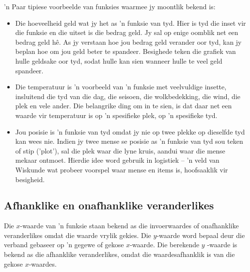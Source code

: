 ’n Paar tipiese voorbeelde van funksies waarmee jy moontlik bekend is:\par 
\begin{itemize}[noitemsep]
\item Die hoeveelheid geld wat jy het as ’n funksie van tyd. Hier is tyd die inset vir die funksie en die uitset is die bedrag geld. Jy sal op enige oomblik net een bedrag geld hê. As jy verstaan hoe jou bedrag geld verander oor tyd, kan jy beplan hoe om jou geld beter te spandeer. Besighede teken die grafiek van hulle geldsake oor tyd, sodat hulle kan sien wanneer hulle te veel geld spandeer. %

\item Die temperatuur is ’n voorbeeld van ’n funksie met veelvuldige insette, insluitend die tyd van die dag, die seisoen, die
wolkbedekking, die wind, die plek en vele ander. Die belangrike ding om in te sien, is dat daar net een waarde vir temperatuur is op ’n spesifieke plek, op ’n spesifieke tyd. %

\item Jou posisie is ’n funksie van tyd omdat jy nie op twee plekke op dieselfde tyd kan wees nie. Indien jy twee mense se posisie as ’n funksie van tyd sou teken of stip (’plot’), sal die plek waar die lyne kruis, aandui waar die mense mekaar ontmoet. Hierdie idee word gebruik in logistiek – ’n veld van Wiskunde wat probeer voorspel waar mense en items is, hoofsaaklik vir besigheid.
\end{itemize}



\subsection*{Afhanklike en onafhanklike veranderlikes}
Die $x$-waarde van 'n funksie staan bekend as die invoerwaardes of onafhanklike veranderlikes omdat die waarde vrylik gekies. Die $y$-waarde word bepaal deur die verband gebaseer op ’n gegewe of gekose $x$-waarde. Die berekende $y$ -waarde is bekend as die afhanklike veranderlikes, omdat die waardesafhanklik is van die gekose $x$-waardes.\par 

